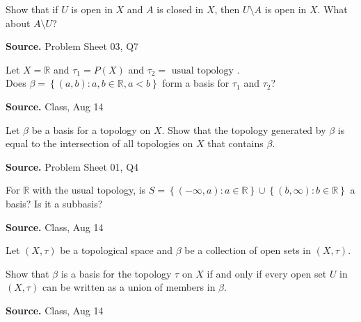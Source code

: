 \documentclass[12pt,twoside]{report}
\newenvironment*{source}{\hfill\scriptsize\textbf{Source.}\space}{\par}
\begin{document}
\begin{samepage}
\begin{ex}
Show that if $U$ is open in $X$ and $A$ is closed in $X$, then $U \setminus A$ is open in $X$. What about $A \setminus U$?
\end{ex}
\begin{source}
Problem Sheet 03, Q7
\end{source}
\end{samepage}

\begin{samepage}
\begin{ex}
    Let $X = \mathbb{R}$ and $\tau_1 = P\left (X\right )$ and $\tau_2 = \text{ usual topology }$. \\
    Does $\beta = \left\{ \left (a,b\right )  :  a,b \in \mathbb{R}, a < b \right\}$ form a basis for $\tau_1$ and $\tau_2$?
\end{ex}
\begin{source}
    Class, Aug 14
\end{source}
\end{samepage}

\begin{samepage}
\begin{ex}
    Let $\beta$ be a basis for a topology on $X$. Show that the topology generated by $\beta$ is equal to the intersection of all topologies on $X$ that contains $\beta$.
\end{ex}
\begin{source}
Problem Sheet 01, Q4
\end{source}
\end{samepage}

\begin{samepage}
\begin{ex}
    For $\mathbb{R}$ with the usual topology, is $S = \left\{ \left (- \infty, a\right )  :  a \in \mathbb{R} \right\} \cup \left\{ \left (b, \infty\right )  :  b \in \mathbb{R} \right\}$ a basis? Is it a subbasis?
\end{ex}
\begin{source}
Class, Aug 14
\end{source}
\end{samepage}

\begin{samepage}
\begin{ex}
Let $\left (X, \tau\right )$ be a topological space and $\beta$ be a collection of open sets in $\left (X, \tau\right )$. 

Show that $\beta$ is a basis for the topology $\tau$ on $X$ if and only if every open set $U$ in $\left (X, \tau\right )$ can be written as a union of members in $\beta$.
\end{ex}
\begin{source}
Class, Aug 14
\end{source}
\end{samepage}
\end{document}
